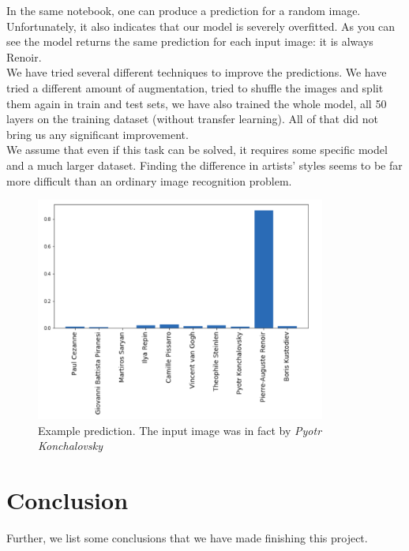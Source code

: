 \documentclass[
	12pt, %
]{fphw}
\begin{document}
\pagebreak
In the same notebook, one can produce a prediction for a random image. Unfortunately, it also indicates that our model is severely overfitted.  As you can see the model returns the same prediction for each input image: it is always Renoir.\\

We have tried several different techniques to improve the predictions. We have tried a different amount of augmentation, tried to shuffle the images and split them again in train and test sets, we have also trained the whole model, all 50 layers on the training dataset (without transfer learning). All of that did not bring us any significant improvement.\\

We assume that even if this task can be solved, it requires some specific model and a much larger dataset. Finding the difference in artists' styles seems to be far more difficult than an ordinary image recognition problem. 

\begin{figure}[H]
	\center \includegraphics[width=0.85\textwidth]{prediction}
	\caption{Example prediction. The input image was in fact by \textit{Pyotr Konchalovsky}}
\end{figure}

 
\pagebreak
\section{Conclusion}

Further, we list some conclusions that we have made finishing this project.
\end{document}
